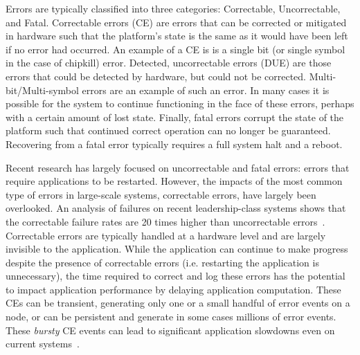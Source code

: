 Errors are typically classified into three categories: Correctable,
Uncorrectable, and Fatal. Correctable errors (CE) are errors that can be
corrected or mitigated in hardware such that the platform's state is the same as it
would have been left if no error had occurred.  An example of a CE is is a single bit 
(or single symbol in the case of chipkill) error.  Detected, uncorrectable errors (DUE) are those
errors that could be detected by hardware, but could not be corrected.
Multi-bit/Multi-symbol errors are an example of such an error.  In many cases
it is possible for the system to continue functioning in the face of these
errors, perhaps with a certain amount of lost state.    Finally, fatal errors corrupt the state of the platform such that continued 
correct operation can no longer be guaranteed.  Recovering from a fatal error typically 
requires a full system halt and a reboot.

Recent research has largely focused on uncorrectable and fatal errors: errors
that require applications to be restarted.  However, the impacts of the most
common type of errors in large-scale systems, correctable errors, have largely
been overlooked. An analysis of failures on recent leadership-class systems
shows that the correctable failure rates are 20 times higher than uncorrectable
errors~\cite{meza:2015:revisiting}.  Correctable errors are typically handled at
a hardware level and are largely invisible to the application.  While the
application can continue to make progress despite the presence of correctable
errors (i.e. restarting the application is unnecessary), the time required to
correct and log these errors has the potential to impact application performance
by delaying application computation. These CEs can be transient, generating only
one or a small handful of error events on a node, or can be persistent and
generate in some cases millions of error events.   These
\emph{bursty} CE events can lead to significant application slowdowns even on
current systems~\cite{BURSTY}.  

